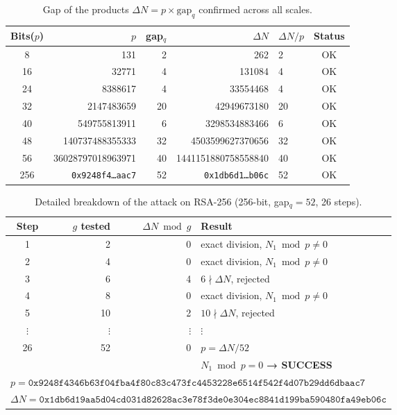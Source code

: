 \documentclass[12pt,a4paper]{article}
\theoremstyle{plain}
\begin{document}
\begin{table}[htbp]
\centering
\caption{Gap of the products $\Delta N = p \times \text{gap}_q$ confirmed
across all scales.}
\label{tab:gap_produto}
\begin{tabular}{crrrlc}
\hline
Bits($p$) & $p$ & gap$_q$ & $\Delta N$ & $\Delta N / p$ & Status \\
\hline
8  & 131 & 2  & 262            & 2  & OK \\
16 & 32771 & 4  & 131084          & 4  & OK \\
24 & 8388617 & 4  & 33554468         & 4  & OK \\
32 & 2147483659 & 20 & 42949673180       & 20 & OK \\
40 & 549755813911 & 6  & 3298534883466     & 6  & OK \\
48 & 140737488355333 & 32 & 4503599627370656   & 32 & OK \\
56 & 36028797018963971 & 40 & 1441151880758558840 & 40 & OK \\
256 & \texttt{0x9248f4\ldots aac7} & 52 & \texttt{0x1db6d1\ldots b06c} & 52 & OK \\
\hline
\end{tabular}
\end{table}

\begin{table}[H]
\centering
\caption{Detailed breakdown of the attack on RSA-256 (256-bit, gap$_q = 52$, 26 steps).}
\label{tab:rsa256_detalhe}
\begin{tabular}{crrl}
\hline
Step & $g$ tested & $\Delta N \bmod g$ & Result \\
\hline
1  & 2  & 0 & exact division, $N_1 \bmod p \neq 0$ \\
2  & 4  & 0 & exact division, $N_1 \bmod p \neq 0$ \\
3  & 6  & 4 & $6 \nmid \Delta N$, rejected \\
4  & 8  & 0 & exact division, $N_1 \bmod p \neq 0$ \\
5  & 10 & 2 & $10 \nmid \Delta N$, rejected \\
$\vdots$ & $\vdots$ & $\vdots$ & $\vdots$ \\
26 & 52 & 0 & $p = \Delta N / 52$ \\[2pt]
   &    &   & $N_1 \bmod p = 0$ \textbf{→ SUCCESS} \\
\hline
\multicolumn{4}{l}{\small $p = \mathtt{0x9248f4346b63f04fba4f80c83c473fc4453228e6514f542f4d07b29dd6dbaac7}$} \\
\multicolumn{4}{l}{\small $\Delta N = \mathtt{0x1db6d19aa5d04cd031d82628ac3e78f3de0e304ec8841d199ba590480fa49eb06c}$} \\
\end{tabular}
\end{table}
\end{document}
